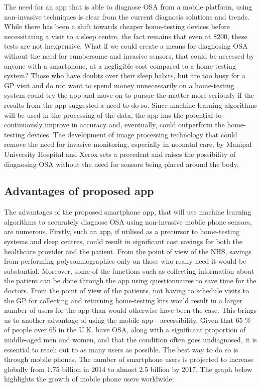 The need for an app that is able to diagnose OSA from a mobile platform, using non-invasive techniques is clear from the current diagnosis solutions and trends. While there has been a shift towards cheaper home-testing devices before necessitating a visit to a sleep centre, the fact remains that even at \$200, these tests are not inexpensive. What if we could create a means for diagnosing OSA without the need for cumbersome and invasive sensors, that could be accessed by anyone with a smartphone, at a negligible cost compared to a home-testing system? Those who have doubts over their sleep habits, but are too busy for a GP visit and do not want to spend money unnecessarily on a home-testing system could try the app and move on to pursue the matter more seriously if the results from the app suggested a need to do so. Since machine learning algorithms will be used in the processing of the data, the app has the potential to continuously improve in accuracy and, eventually, could outperform the home-testing devices. The development of image processing technology that could remove the need for invasive monitoring, especially in neonatal care, by Manipal University Hospital and Xerox sets a precedent and raises the possibility of diagnosing OSA without the need for sensors being placed around the body.


\subsection{Advantages of proposed app}

The advantages of the proposed smartphone app, that will use machine learning algorithms to accurately diagnose OSA using non-invasive mobile phone sensors, are numerous. Firstly, such an app, if utilised as a precursor to home-testing systems and sleep centres, could result in significant cost savings for both the healthcare provider and the patient. From the point of view of the NHS, savings from performing polysomnographies only on those who really need it would be substantial. Moreover, some of the functions such as collecting information about the patient can be done through the app using questionnaires to save time for the doctors. From the point of view of the patients, not having to schedule visits to the GP for collecting and returning home-testing kits would result in a larger number of users for the app than would otherwise have been the case.
This brings us to another advantage of using the mobile app - accessibility. Given that 65 \% of people over 65 in the U.K. have OSA, along with a significant proportion of middle-aged men and women, and that the condition often goes undiagnosed, it is essential to reach out to as many users as possible. The best way to do so is through mobile phones. The number of smartphone users is projected to increase globally from 1.75 billion in 2014 to almost 2.5 billion by 2017. The graph below highlights the growth of mobile phone users worldwide:

